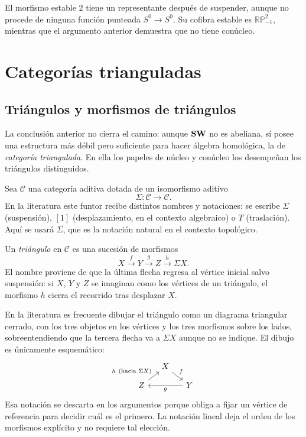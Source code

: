 \begin{nota}
   El morfismo estable $2$ tiene un representante después de suspender, aunque no procede de ninguna función punteada $S^0\to S^0$. Su cofibra estable es $\mathbb{RP}^2_{-1}$, mientras que el argumento anterior demuestra que no tiene conúcleo.
\end{nota}

\section{Categorías trianguladas}

\subsection{Triángulos y morfismos de triángulos}

La conclusión anterior no cierra el camino: aunque $\mathbf{SW}$ no es abeliana, sí posee una estructura más débil pero suficiente para hacer álgebra homológica, la de \emph{categoría triangulada}. En ella los papeles de núcleo y conúcleo los desempeñan los triángulos distinguidos.

Sea $\mathcal C$ una categoría aditiva dotada de un isomorfismo aditivo
\[
\Sigma\colon\mathcal C\longrightarrow\mathcal C .
\]
En la literatura este funtor recibe distintos nombres y notaciones: se escribe $\Sigma$ (suspensión), $[1]$ (desplazamiento, en el contexto algebraico) o $T$ (traslación). Aquí se usará $\Sigma$, que es la notación natural en el contexto topológico.

\begin{defi}
Un \emph{triángulo} en $\mathcal C$ es una sucesión de morfismos
\[
X\xrightarrow{\ f\ }Y\xrightarrow{\ g\ }Z\xrightarrow{\ h\ }\Sigma X .
\]
El nombre proviene de que la última flecha regresa al vértice inicial salvo suspensión: si $X$, $Y$ y $Z$ se imaginan como los vértices de un triángulo, el morfismo $h$ cierra el recorrido tras desplazar $X$.
\end{defi}

\begin{nota}
   En la literatura es frecuente dibujar el triángulo como un diagrama triangular cerrado, con los
   tres objetos en los vértices y los tres morfismos sobre los lados, sobreentendiendo que la
   tercera flecha va a $\Sigma X$ aunque no se indique. El dibujo es únicamente esquemático:
\[
\begin{tikzcd}[column sep=small,row sep=small]
& X \arrow[dr,"f"] &\\
Z \arrow[ur,"h\ \text{(hacia }\Sigma X\text{)}"] & & Y \arrow[ll,"g"]
\end{tikzcd}
\]
   Esa notación se descarta en los argumentos porque obliga
   a fijar un vértice de referencia para decidir cuál es el primero. La notación lineal deja el
   orden de los morfismos explícito y no requiere tal elección.
\end{nota}

